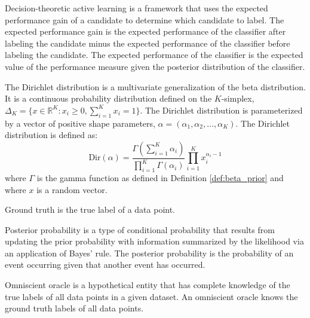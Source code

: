 \begin{defn}
\label{def:decision_theoretic}
Decision-theoretic active learning is a framework that uses the expected performance gain of a candidate to determine which candidate to label. The expected performance gain is the expected performance of the classifier after labeling the candidate minus the expected performance of the classifier before labeling the candidate. The expected performance of the classifier is the expected value of the performance measure given the posterior distribution of the classifier.
\end{defn}

\begin{defn}
\label{def:dirichlet_distribution}
The Dirichlet distribution is a multivariate generalization of the beta distribution. It is a continuous probability distribution defined on the \(K\)-simplex, \(\Delta_K = \{x \in \mathbb{R}^K: x_i \geq 0, \sum_{i=1}^K x_i = 1\}\). The Dirichlet distribution is parameterized by a vector of positive shape parameters, \(\alpha = (\alpha_1, \alpha_2, \dots, \alpha_K)\). The Dirichlet distribution is defined as:
\[\text{Dir}(\alpha) = \frac{\Gamma(\sum_{i=1}^K \alpha_i)}{\prod_{i=1}^K \Gamma(\alpha_i)}\prod_{i=1}^K x_i^{\alpha_i - 1}\]
where \(\Gamma\) is the gamma function as defined in Definition \ref{def:beta_prior} and where \(x\) is a random vector.
\end{defn}

\begin{defn}
\label{def:ground_truth}
Ground truth is the true label of a data point.
\end{defn}

\begin{defn}
\label{def:posterior_probabilities}
Posterior probability is a type of conditional probability that results from updating the prior probability with information summarized by the likelihood via an application of Bayes' rule. The posterior probability is the probability of an event occurring given that another event has occurred.
\end{defn}

\begin{defn}
\label{def:omniscient_oracles}
Omniscient oracle is a hypothetical entity that has complete knowledge of the true labels of all data points in a given dataset. An omniscient oracle knows the ground truth labels of all data points.
\end{defn}

